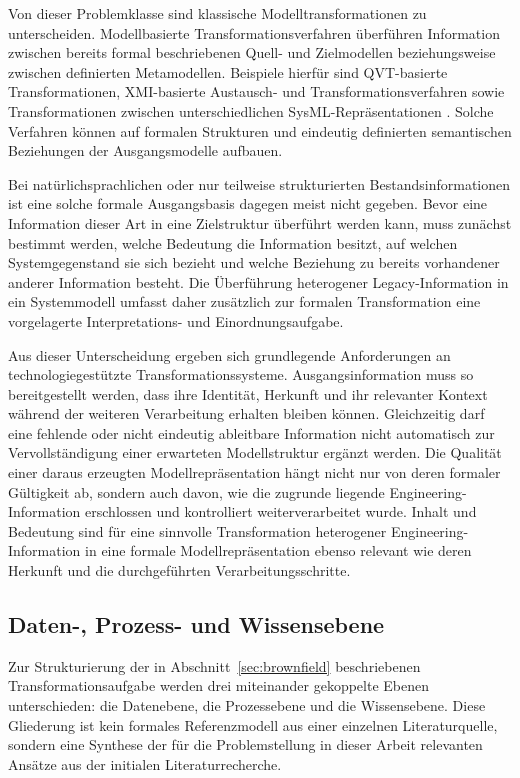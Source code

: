 Von dieser Problemklasse sind klassische Modelltransformationen zu
unterscheiden. Modellbasierte Transformationsverfahren überführen Information
zwischen bereits formal beschriebenen Quell- und Zielmodellen beziehungsweise
zwischen definierten Metamodellen. Beispiele hierfür sind QVT-basierte
Transformationen, XMI-basierte Austausch- und Transformationsverfahren sowie
Transformationen zwischen unterschiedlichen SysML-Repräsentationen
\cite{Kapos.2014,Li.2022,Zhou.2024,Greenyer.2007}. Solche Verfahren können auf
formalen Strukturen und eindeutig definierten semantischen Beziehungen der
Ausgangsmodelle aufbauen.

Bei natürlichsprachlichen oder nur teilweise strukturierten
Bestandsinformationen ist eine solche formale Ausgangsbasis dagegen meist
nicht gegeben. Bevor eine Information dieser Art in eine Zielstruktur
überführt werden kann, muss zunächst bestimmt werden, welche Bedeutung die
Information besitzt, auf welchen Systemgegenstand sie sich bezieht und welche
Beziehung zu bereits vorhandener anderer Information besteht. Die Überführung
heterogener Legacy-Information in ein Systemmodell umfasst daher zusätzlich
zur formalen Transformation eine vorgelagerte Interpretations- und
Einordnungsaufgabe.

Aus dieser Unterscheidung ergeben sich grundlegende Anforderungen an
technologiegestützte Transformationssysteme. Ausgangsinformation muss so
bereitgestellt werden, dass ihre Identität, Herkunft und ihr relevanter
Kontext während der weiteren Verarbeitung erhalten bleiben können.
Gleichzeitig darf eine fehlende oder nicht eindeutig ableitbare Information
nicht automatisch zur Vervollständigung einer erwarteten Modellstruktur
ergänzt werden. Die Qualität einer daraus erzeugten Modellrepräsentation hängt
nicht nur von deren formaler Gültigkeit ab, sondern auch davon, wie die
zugrunde liegende Engineering-Information erschlossen und kontrolliert
weiterverarbeitet wurde. Inhalt und Bedeutung sind für eine sinnvolle
Transformation heterogener Engineering-Information in eine formale
Modellrepräsentation ebenso relevant wie deren Herkunft und die
durchgeführten Verarbeitungsschritte.

\subsection{Daten-, Prozess- und Wissensebene}
\label{sec:dreischichtenmodell}

Zur Strukturierung der in Abschnitt~\ref{sec:brownfield} beschriebenen
Transformationsaufgabe werden drei miteinander gekoppelte Ebenen
unterschieden: die Datenebene, die Prozessebene und die Wissensebene. Diese
Gliederung ist kein formales Referenzmodell aus einer einzelnen
Literaturquelle, sondern eine Synthese der für die Problemstellung in dieser
Arbeit relevanten Ansätze aus der initialen Literaturrecherche.

